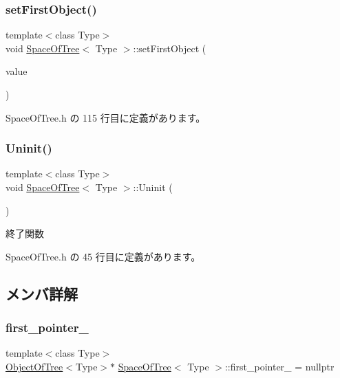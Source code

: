 \subsubsection{\texorpdfstring{set\+First\+Object()}{setFirstObject()}}
{\footnotesize\ttfamily template$<$class Type$>$ \\
void \mbox{\hyperlink{class_space_of_tree}{Space\+Of\+Tree}}$<$ Type $>$\+::set\+First\+Object (\begin{DoxyParamCaption}\item[{\mbox{\hyperlink{class_object_of_tree}{Object\+Of\+Tree}}$<$ Type $>$ $\ast$}]{value }\end{DoxyParamCaption})\hspace{0.3cm}{\ttfamily [inline]}}



 Space\+Of\+Tree.\+h の 115 行目に定義があります。

\mbox{\label{class_space_of_tree_a8f7238becd1df9192e5f5ddc442b7ee3}} 
\subsubsection{\texorpdfstring{Uninit()}{Uninit()}}
{\footnotesize\ttfamily template$<$class Type$>$ \\
void \mbox{\hyperlink{class_space_of_tree}{Space\+Of\+Tree}}$<$ Type $>$\+::Uninit (\begin{DoxyParamCaption}{ }\end{DoxyParamCaption})\hspace{0.3cm}{\ttfamily [inline]}}



終了関数 



 Space\+Of\+Tree.\+h の 45 行目に定義があります。



\subsection{メンバ詳解}
\mbox{\label{class_space_of_tree_afc9920e9fc6499dfe6fada154e69fa0f}} 
\subsubsection{\texorpdfstring{first\+\_\+pointer\+\_\+}{first\_pointer\_}}
{\footnotesize\ttfamily template$<$class Type$>$ \\
\mbox{\hyperlink{class_object_of_tree}{Object\+Of\+Tree}}$<$Type$>$$\ast$ \mbox{\hyperlink{class_space_of_tree}{Space\+Of\+Tree}}$<$ Type $>$\+::first\+\_\+pointer\+\_\+ = nullptr\hspace{0.3cm}{\ttfamily [private]}}




